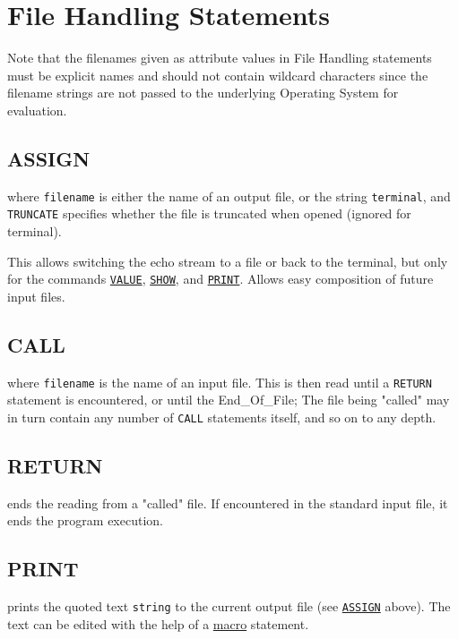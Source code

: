 \chapter{File Handling Statements}
\label{chap:files}

Note that the filenames given as attribute values in File Handling statements 
must be explicit names and should not contain wildcard characters since the 
filename strings are not passed to the underlying Operating System for evaluation.


\section{ASSIGN}
\label{sec:assign}

where \texttt{filename} is either the name of an output file, or the
string \texttt{terminal}, and \texttt{TRUNCATE} specifies whether the
file is truncated when opened 
(ignored for terminal). 

This allows switching the echo stream to a file or back to the terminal,
but only for the commands \hyperref[sec:value]{\texttt{VALUE}}, 
\hyperref[sec:show]{\texttt{SHOW}}, and \hyperref[sec:print]{\texttt{PRINT}}. 
Allows easy composition of future \madx input files.


\section{CALL}
\label{sec:call}
where \texttt{filename} is the name of an input file. This is then read
until a \texttt{RETURN} statement is encountered, or until the
End\_Of\_File; The file being "called" may in turn contain any number of
\texttt{CALL} statements itself, and so on to any depth.

\section{RETURN}
\label{Sec:return}
ends the reading from a "called" file. If encountered in the standard
input file, it ends the program execution.  


\section{PRINT}
\label{sec:print}
prints the quoted text \texttt{string} to the current output file (see
\hyperref[sec:assign]{\texttt{ASSIGN}} above). The text can be edited
with the help of a \hyperref[sec:macro]{macro} statement.


